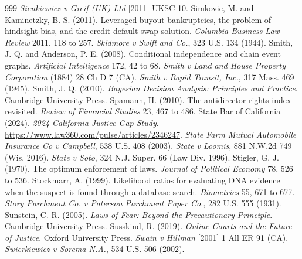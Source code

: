 \begin{thebibliography}{999}
 \emph{Sienkiewicz v Greif (UK) Ltd} [2011] UKSC 10.
 Simkovic, M. and Kaminetzky, B. S. (2011). Leveraged buyout bankruptcies, the problem of hindsight bias, and the credit default swap solution. \emph{Columbia Business Law Review} 2011, 118 to 257.
 \emph{Skidmore v Swift and Co.}, 323 U.S. 134 (1944).
 Smith, J. Q. and Anderson, P. E. (2008). Conditional independence and chain event graphs. \emph{Artificial Intelligence} 172, 42 to 68.
 \emph{Smith v Land and House Property Corporation} (1884) 28 Ch D 7 (CA).
 \emph{Smith v Rapid Transit, Inc.}, 317 Mass. 469 (1945).
 Smith, J. Q. (2010). \emph{Bayesian Decision Analysis: Principles and Practice}. Cambridge University Press.
 Spamann, H. (2010). The antidirector rights index revisited. \emph{Review of Financial Studies} 23, 467 to 486.
 State Bar of California (2024). \emph{2024 California Justice Gap Study}. \url{https://www.law360.com/pulse/articles/2346247}.
 \emph{State Farm Mutual Automobile Insurance Co v Campbell}, 538 U.S. 408 (2003).
 \emph{State v Loomis}, 881 N.W.2d 749 (Wis. 2016).
 \emph{State v Soto}, 324 N.J. Super. 66 (Law Div. 1996).
 Stigler, G. J. (1970). The optimum enforcement of laws. \emph{Journal of Political Economy} 78, 526 to 536.
 Stockmarr, A. (1999). Likelihood ratios for evaluating DNA evidence when the suspect is found through a database search. \emph{Biometrics} 55, 671 to 677.
 \emph{Story Parchment Co. v Paterson Parchment Paper Co.}, 282 U.S. 555 (1931).
 Sunstein, C. R. (2005). \emph{Laws of Fear: Beyond the Precautionary Principle}. Cambridge University Press.
 Susskind, R. (2019). \emph{Online Courts and the Future of Justice}. Oxford University Press.
 \emph{Swain v Hillman} [2001] 1 All ER 91 (CA).
 \emph{Swierkiewicz v Sorema N.A.}, 534 U.S. 506 (2002).

\end{thebibliography}
